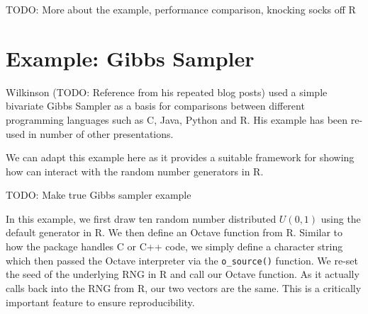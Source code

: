 
TODO: More about the example, performance comparison, knocking socks off R


\section{Example: Gibbs Sampler}

Wilkinson (TODO: Reference from his repeated blog posts) used a simple
bivariate Gibbs Sampler as a basis for comparisons between different
programming languages such as C, Java, Python and R. His example has been
re-used in number of other presentations.

We can adapt this example here as it provides a suitable framework for
showing how  can interact with the random number generators
in R.

TODO: Make true Gibbs sampler example
{\small
\begin{knitrout}
\color{fgcolor}
\end{knitrout}

}

In this example, we first draw ten random number distributed $U(0,1)$ using
the default generator in R. We then define an Octave function from R. Similar
to how the  package \citep{CRAN:inline} handles C or C++ code, we
simply define a character string which then passed the Octave interpreter via
the \verb|o_source()| function.  We re-set the seed of the underlying RNG in
R and call our Octave function. As it actually calls back into the RNG from
R, our two vectors are the same.  This is a critically important feature to
ensure reproducibility.

